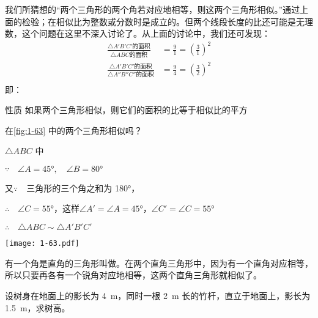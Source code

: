 我们所猜想的“两个三角形的两个角若对应地相等，则这两个三角形相似。”通过上面的检验；在相似比为整数或分数时是成立的。但两个线段长度的比还可能是无理数，这个问题在这里不深入讨论了。从上面的讨论中，我们还可发现：
\[\begin{split}
	\frac{\triangle A'B'C'\text{的面积} }{\triangle ABC\text{的面积}}&=\frac{9}{1}=\left(\frac{3}{1}\right)^2\\
	\frac{\triangle A'B'C'\text{的面积} }{\triangle A''B''C''\text{的面积}}&=\frac{9}{4}=\left(\frac{3}{2}\right)^2\\
\end{split}\]
即：%
\begin{Theorem}{性质}
	如果两个三角形相似，则它们的面积的比等于相似比的平方
\end{Theorem}

\begin{example}
	在\cref{fig:1-63} 中的两个三角形相似吗？
\end{example}

\noindent
\begin{minipage}{0.5\linewidth}
	\begin{solution}
		$\triangle ABC$ 中
		
		$\because\quad \angle A=\ang{45},\quad \angle B=\ang{80}$
		
		又$\because\quad $三角形的三个角之和为 \ang{180}，
		
		$\therefore\quad \angle C=\ang{55}$，这样$\angle A'=\angle A=\ang{45}$，$\angle C'=\angle C=\ang{55}$
		
		$\therefore\quad \triangle ABC\sim \triangle A'B'C'$
	\end{solution}
\end{minipage}%
\begin{minipage}{0.5\linewidth}\centering
	\texttt{[image: 1-63.pdf]}
	\label{fig:1-63}
\end{minipage}

\bigskip
有一个角是直角的三角形叫做。在两个直角三角形中，因为有一个直角对应相等，所以只要再各有一个锐角对应地相等，这两个直角三角形就相似了。

\begin{example}
设树身在地面上的影长为 \qty{4}{m}，同时一根 \qty{2}{m} 长的竹杆，直立于地面上，影长为 \qty{1.5}{m}，求树高。
\end{example}

